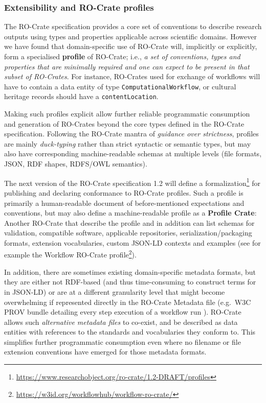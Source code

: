 \subsubsection{Extensibility and RO-Crate profiles}\label{ch5:profiles}

The RO-Crate specification provides a core set of conventions to
describe research outputs using types and properties applicable across
scientific domains. However we have found that domain-specific use of
RO-Crate will, implicitly or explicitly, form a specialised
\textbf{profile} of RO-Crate; i.e., \emph{a set of conventions, types
and properties that are minimally required and one can expect to be
present in that subset of RO-Crates}. For instance, RO-Crates used for
exchange of workflows will have to contain a data entity of type
\texttt{ComputationalWorkflow}, or cultural heritage records should have
a \texttt{contentLocation}.

Making such profiles explicit allow further reliable programmatic
consumption and generation of RO-Crates beyond the core types defined in
the RO-Crate specification. Following the RO-Crate mantra of
\emph{guidance over strictness}, profiles are mainly \emph{duck-typing}
rather than strict syntactic or semantic types, but may also have
corresponding machine-readable schemas at multiple levels (file formats,
JSON, RDF shapes, \acrshort{RDFS}/OWL semantics).

The next version of the RO-Crate specification 1.2 will define a
formalization\footnote{\url{https://www.researchobject.org/ro-crate/1.2-DRAFT/profiles}}
for publishing and declaring conformance to RO-Crate profiles. Such a
profile is primarily a human-readable document of before-mentioned
expectations and conventions, but may also define a machine-readable
profile as a \textbf{Profile Crate}: Another RO-Crate that describe the
profile and in addition can list schemas for validation, compatible
software, applicable repositories, serialization/packaging formats,
extension vocabularies, custom JSON-LD contexts and examples (see for
example the Workflow RO-Crate
profile\footnote{\url{https://w3id.org/workflowhub/workflow-ro-crate/}}).


In addition, there are sometimes existing domain-specific metadata
formats, but they are either not RDF-based (and thus time-consuming to
construct terms for in JSON-LD) or are at a different granularity level
that might become overwhelming if represented directly in the RO-Crate
Metadata file (e.g.~W3C PROV bundle detailing every step execution of a
workflow run
\cite{Khan 2019}). RO-Crate
allows such \emph{alternative metadata files} to co-exist, and be
described as data entities with references to the standards and
vocabularies they conform to. This simplifies further programmatic
consumption even where no filename or file extension conventions have
emerged for those metadata formats.

